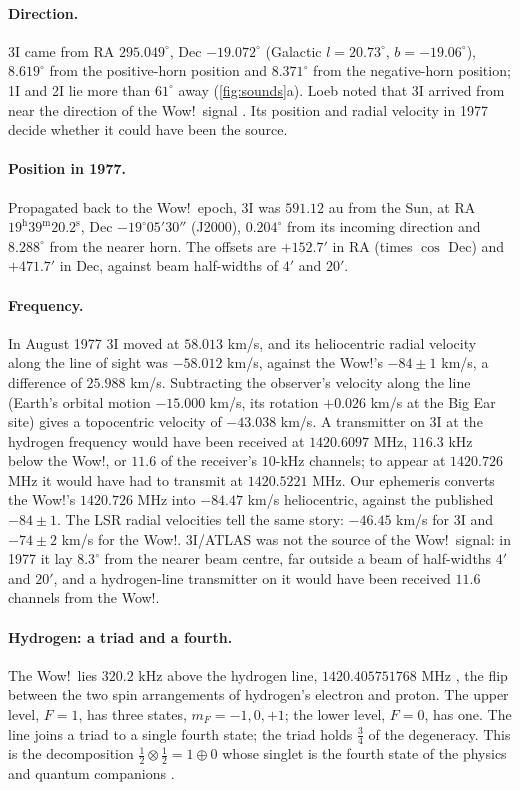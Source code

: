 \documentclass[11pt]{article}
\theoremstyle{definition}\newtheorem{definition}[theorem]{Definition}
\theoremstyle{remark}\newtheorem{remark}[theorem]{Remark}
\begin{document}
\paragraph{Direction.} 3I came from RA $295.049^\circ$, Dec $-19.072^\circ$ (Galactic $l=20.73^\circ$, $b=-19.06^\circ$), $8.619^\circ$ from the positive-horn position and $8.371^\circ$ from the negative-horn position; 1I and 2I lie more than $61^\circ$ away (\cref{fig:sounds}a). Loeb noted that 3I arrived from near the direction of the Wow!\ signal \cite{LoebWow}. Its position and radial velocity in 1977 decide whether it could have been the source.

\paragraph{Position in 1977.} Propagated back to the Wow!\ epoch, 3I was $591.12$ au from the Sun, at RA $19^\mathrm{h}39^\mathrm{m}20.2^\mathrm{s}$, Dec $-19^\circ05'30''$ (J2000), $0.204^\circ$ from its incoming direction and $8.288^\circ$ from the nearer horn. The offsets are $+152.7'$ in RA (times $\cos$ Dec) and $+471.7'$ in Dec, against beam half-widths of $4'$ and $20'$.

\paragraph{Frequency.} In August 1977 3I moved at $58.013$ km/s, and its heliocentric radial velocity along the line of sight was $-58.012$ km/s, against the Wow!'s $-84\pm1$ km/s, a difference of $25.988$ km/s. Subtracting the observer's velocity along the line (Earth's orbital motion $-15.000$ km/s, its rotation $+0.026$ km/s at the Big Ear site) gives a topocentric velocity of $-43.038$ km/s. A transmitter on 3I at the hydrogen frequency would have been received at $1420.6097$ MHz, $116.3$ kHz below the Wow!, or $11.6$ of the receiver's $10$-kHz channels; to appear at $1420.726$ MHz it would have had to transmit at $1420.5221$ MHz. Our ephemeris converts the Wow!'s $1420.726$ MHz into $-84.47$ km/s heliocentric, against the published $-84\pm1$. The LSR radial velocities tell the same story: $-46.45$ km/s for 3I and $-74\pm2$ km/s for the Wow!. 3I/ATLAS was not the source of the Wow!\ signal: in 1977 it lay $8.3^\circ$ from the nearer beam centre, far outside a beam of half-widths $4'$ and $20'$, and a hydrogen-line transmitter on it would have been received $11.6$ channels from the Wow!.

\paragraph{Hydrogen: a triad and a fourth.} The Wow!\ lies $320.2$ kHz above the hydrogen line, $1420.405751768$ MHz \cite{Hellwig}, the flip between the two spin arrangements of hydrogen's electron and proton. The upper level, $F=1$, has three states, $m_F=-1,0,+1$; the lower level, $F=0$, has one. The line joins a triad to a single fourth state; the triad holds $\frac34$ of the degeneracy. This is the decomposition $\frac12\otimes\frac12=1\oplus0$ whose singlet is the fourth state of the physics and quantum companions \cite{SPhys,SQuant}.
\end{document}
